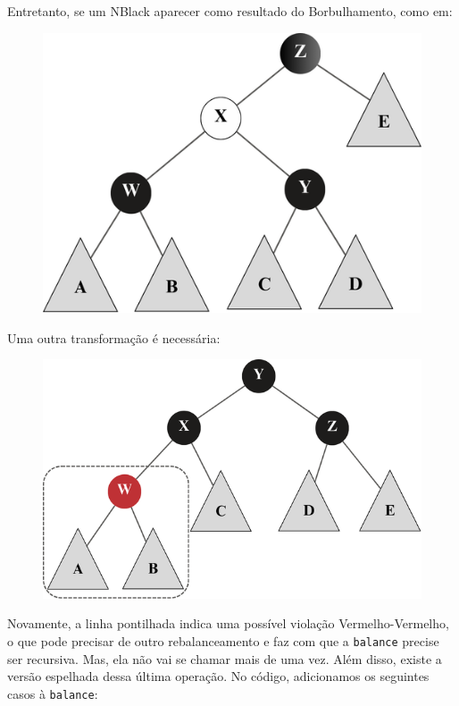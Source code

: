 Entretanto, se um NBlack aparecer como resultado do Borbulhamento, como em:

\begin{figure}[!ht]
	\centering
	\includegraphics[scale=0.5]{figures/rubro-negra/balance-removal-extra-case.png}
\end{figure}
\FloatBarrier

Uma outra transformação é necessária:

\begin{figure}[!ht]
	\centering
	\includegraphics[scale=0.5]{figures/rubro-negra/balance-removal-extra-case-solution.png}
\end{figure}
\FloatBarrier

Novamente, a linha pontilhada indica uma possível violação Vermelho-Vermelho, o que pode precisar de outro rebalanceamento e faz com que a \texttt{balance} precise ser recursiva. Mas, ela não vai se chamar mais de uma vez.
Além disso, existe a versão espelhada dessa última operação. No código, adicionamos os seguintes casos à \texttt{balance}:

